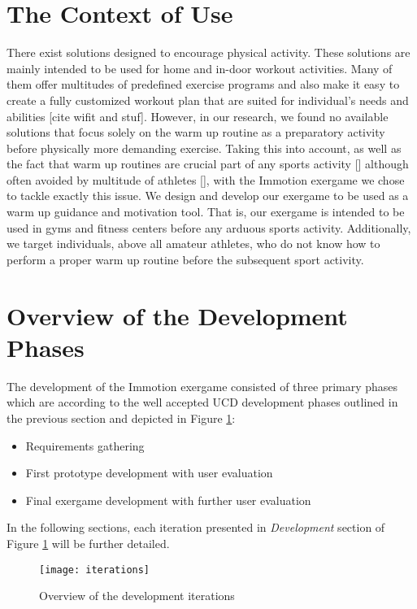 \section{The Context of Use}
There exist solutions designed to encourage physical activity. These solutions are mainly intended to be used for home and in-door workout activities. Many of them offer multitudes of predefined exercise programs and also make it easy to create a fully customized workout plan that are suited for individual's needs and abilities [cite wifit and stuf]. However, in our research, we found no available solutions that focus solely on the warm up routine as a preparatory activity before physically more demanding exercise. Taking this into account, as well as the fact that warm up routines are crucial part of any sports activity [] although often avoided by multitude of athletes [], with the Immotion exergame we chose to tackle exactly this issue. We design and develop our exergame to be used as a warm up guidance and motivation tool. That is, our exergame is intended to be used in gyms and fitness centers before any arduous sports activity. Additionally, we target individuals, above all amateur athletes, who do not know how to perform a proper warm up routine before the subsequent sport activity. \pagebreak
\section{Overview of the Development Phases}
The development of the Immotion exergame consisted of three primary phases which are according to the well accepted UCD development phases outlined in the previous section and depicted in Figure \ref{fig:iterations}: 
\begin{itemize}
\item Requirements gathering 
\item First prototype development with user evaluation
\item Final exergame development with further user evaluation
\end{itemize}
In the following sections, each iteration presented in \textit{Development} section of Figure \ref{fig:iterations} will be further detailed. 
\begin{figure}[h]
    \centering
    \texttt{[image: iterations]}
    \caption{Overview of the development iterations}
    \label{fig:iterations}
\end{figure}
